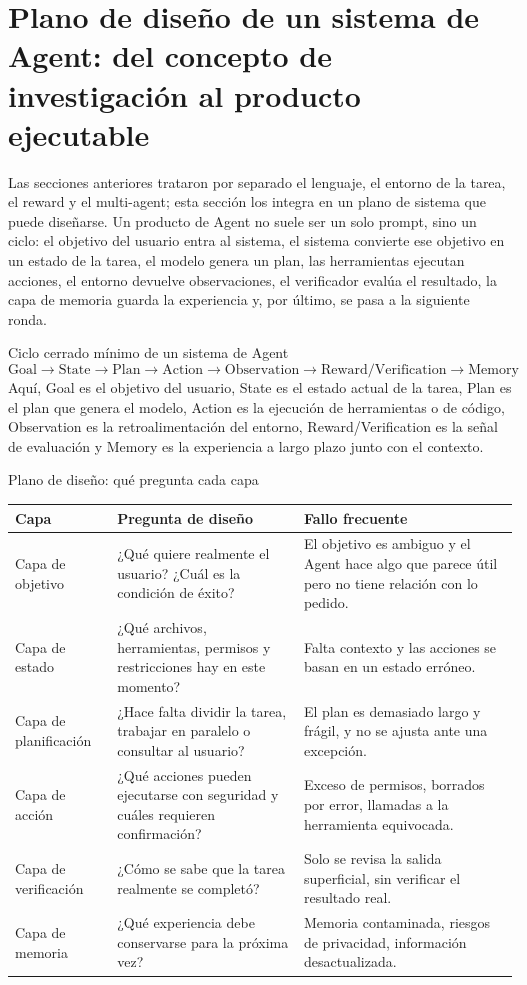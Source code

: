 \documentclass[a4paper]{article}
\begin{document}
\section{Plano de diseño de un sistema de Agent: del concepto de investigación al producto ejecutable}

Las secciones anteriores trataron por separado el lenguaje, el entorno de la tarea, el reward y el multi-agent; esta sección los integra en un plano de sistema que puede diseñarse. Un producto de Agent no suele ser un solo prompt, sino un ciclo: el objetivo del usuario entra al sistema, el sistema convierte ese objetivo en un estado de la tarea, el modelo genera un plan, las herramientas ejecutan acciones, el entorno devuelve observaciones, el verificador evalúa el resultado, la capa de memoria guarda la experiencia y, por último, se pasa a la siguiente ronda.

\begin{importantbox}{Ciclo cerrado mínimo de un sistema de Agent}
\[
\text{Goal} \rightarrow \text{State} \rightarrow \text{Plan} \rightarrow \text{Action} \rightarrow \text{Observation} \rightarrow \text{Reward/Verification} \rightarrow \text{Memory}
\]
Aquí, Goal es el objetivo del usuario, State es el estado actual de la tarea, Plan es el plan que genera el modelo, Action es la ejecución de herramientas o de código, Observation es la retroalimentación del entorno, Reward/Verification es la señal de evaluación y Memory es la experiencia a largo plazo junto con el contexto.
\end{importantbox}

\begin{knowledgebox}{Plano de diseño: qué pregunta cada capa}
\begin{tabularx}{\textwidth}{p{}p{}X}
\toprule
Capa & Pregunta de diseño & Fallo frecuente \\
\midrule
Capa de objetivo & ¿Qué quiere realmente el usuario? ¿Cuál es la condición de éxito? & El objetivo es ambiguo y el Agent hace algo que parece útil pero no tiene relación con lo pedido. \\
Capa de estado & ¿Qué archivos, herramientas, permisos y restricciones hay en este momento? & Falta contexto y las acciones se basan en un estado erróneo. \\
Capa de planificación & ¿Hace falta dividir la tarea, trabajar en paralelo o consultar al usuario? & El plan es demasiado largo y frágil, y no se ajusta ante una excepción. \\
Capa de acción & ¿Qué acciones pueden ejecutarse con seguridad y cuáles requieren confirmación? & Exceso de permisos, borrados por error, llamadas a la herramienta equivocada. \\
Capa de verificación & ¿Cómo se sabe que la tarea realmente se completó? & Solo se revisa la salida superficial, sin verificar el resultado real. \\
Capa de memoria & ¿Qué experiencia debe conservarse para la próxima vez? & Memoria contaminada, riesgos de privacidad, información desactualizada. \\
\bottomrule
\end{tabularx}
\end{knowledgebox}
\end{document}
